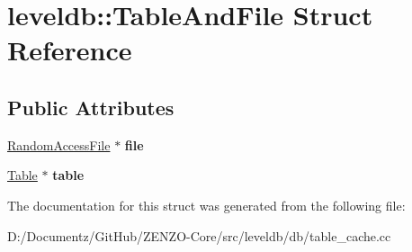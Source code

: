\hypertarget{structleveldb_1_1_table_and_file}{}\section{leveldb\+::Table\+And\+File Struct Reference}
\label{structleveldb_1_1_table_and_file}
\subsection*{Public Attributes}
\begin{DoxyCompactItemize}
\item 
\mbox{\label{structleveldb_1_1_table_and_file_a7f1f72d4654e4ab49aab750330036edb}} 
\mbox{\hyperlink{classleveldb_1_1_random_access_file}{Random\+Access\+File}} $\ast$ {\bfseries file}
\item 
\mbox{\label{structleveldb_1_1_table_and_file_ab2df8b8a6c028cfcf36885fe76f48c99}} 
\mbox{\hyperlink{classleveldb_1_1_table}{Table}} $\ast$ {\bfseries table}
\end{DoxyCompactItemize}


The documentation for this struct was generated from the following file\+:\begin{DoxyCompactItemize}
\item 
D\+:/\+Documentz/\+Git\+Hub/\+Z\+E\+N\+Z\+O-\/\+Core/src/leveldb/db/table\+\_\+cache.\+cc\end{DoxyCompactItemize}
